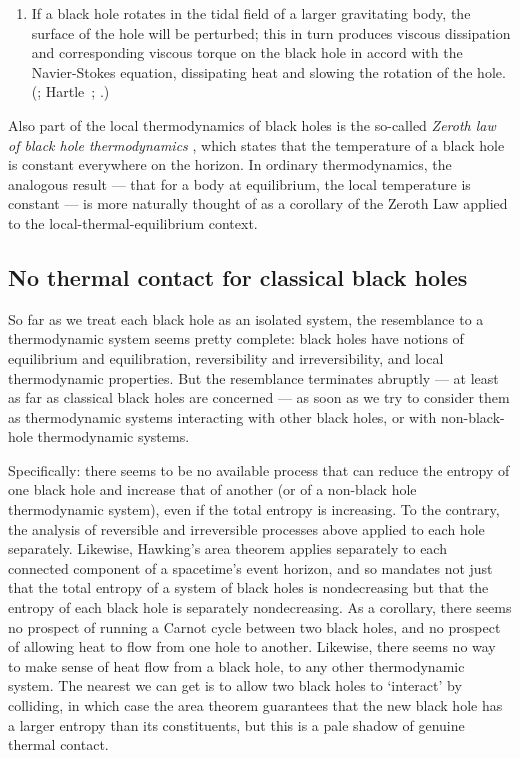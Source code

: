 \documentclass[12pt]{article}
\begin{document}
\begin{enumerate}
\item If a black hole rotates in the tidal field of a larger gravitating body, the surface of the hole will be perturbed; this in turn produces viscous dissipation and corresponding viscous torque on the black hole in accord with the Navier-Stokes equation, dissipating heat and slowing the rotation of the hole. (; Hartle~; .)
\end{enumerate}
Also part of the local thermodynamics of black holes is the so-called \emph{Zeroth law of black hole thermodynamics} \cite{bardeenlaws}, which states that the temperature of a black hole is constant everywhere on the horizon. In ordinary thermodynamics, the analogous result --- that for a body at equilibrium, the local temperature is constant --- is more naturally thought of as a corollary of the Zeroth Law applied to the local-thermal-equilibrium context.
 
 \subsection{No thermal contact for classical black holes}\label{bekensteinbound}
 
 So far as we treat each black hole as an isolated system, the resemblance to a thermodynamic system seems pretty complete: black holes have notions of equilibrium and equilibration, reversibility and irreversibility, and local thermodynamic properties. But the resemblance terminates abruptly --- at least as far as classical black holes are concerned --- as soon as we try to consider them as thermodynamic systems interacting with other black holes, or with non-black-hole thermodynamic systems.
 
Specifically: there seems to be no available process that can reduce the entropy of one black hole and increase that of another (or of a non-black hole thermodynamic system), even if the total entropy is increasing. To the contrary, the analysis of reversible and irreversible processes above applied to each hole separately. Likewise, Hawking's area theorem applies separately to each connected component of a spacetime's event horizon, and so mandates not just that the total entropy of a system of black holes is nondecreasing but that the entropy of each black hole is separately nondecreasing. As a corollary, there seems no prospect of running a Carnot cycle between two black holes, and no prospect of allowing heat to flow from one hole to another. Likewise, there seems no way to make sense of heat flow from a black hole, to any other thermodynamic system. The nearest we can get is to allow two black holes to `interact' by colliding, in which case the area theorem guarantees that the new black hole has a larger entropy than its constituents, but this is a pale shadow of genuine thermal contact.
 
\end{document}
